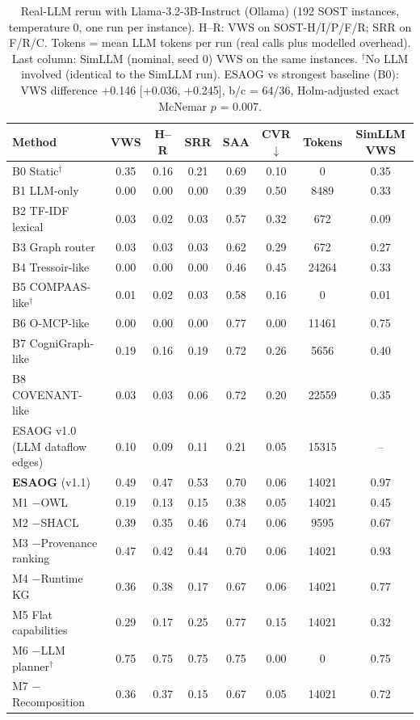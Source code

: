 \begin{table}[H]
\centering
\caption{Real-LLM rerun with Llama-3.2-3B-Instruct (Ollama) (192 SOST instances, temperature 0, one run per instance). H--R: VWS on SOST-H/I/P/F/R; SRR on F/R/C. Tokens = mean LLM tokens per run (real calls plus modelled overhead). Last column: SimLLM (nominal, seed 0) VWS on the same instances. $^\dagger$No LLM involved (identical to the SimLLM run). ESAOG vs strongest baseline (B0): VWS difference +0.146 [+0.036, +0.245], b/c = 64/36, Holm-adjusted exact McNemar $p$ = 0.007.}
\label{tab:real_llama32-3b}
\scriptsize
\begin{tabular}{lccccccc}
\toprule
Method & VWS & H--R & SRR & SAA & CVR$\downarrow$ & Tokens & SimLLM VWS\\
\midrule
B0 Static$^\dagger$ & 0.35 & 0.16 & 0.21 & 0.69 & 0.10 & 0 & 0.35\\
B1 LLM-only & 0.00 & 0.00 & 0.00 & 0.39 & 0.50 & 8489 & 0.33\\
B2 TF-IDF lexical & 0.03 & 0.02 & 0.03 & 0.57 & 0.32 & 672 & 0.09\\
B3 Graph router & 0.03 & 0.03 & 0.03 & 0.62 & 0.29 & 672 & 0.27\\
B4 Tressoir-like & 0.00 & 0.00 & 0.00 & 0.46 & 0.45 & 24264 & 0.33\\
B5 COMPAAS-like$^\dagger$ & 0.01 & 0.02 & 0.03 & 0.58 & 0.16 & 0 & 0.01\\
B6 O-MCP-like & 0.00 & 0.00 & 0.00 & 0.77 & 0.00 & 11461 & 0.75\\
B7 CogniGraph-like & 0.19 & 0.16 & 0.19 & 0.72 & 0.26 & 5656 & 0.40\\
B8 COVENANT-like & 0.03 & 0.03 & 0.06 & 0.72 & 0.20 & 22559 & 0.35\\
ESAOG v1.0 (LLM dataflow edges) & 0.10 & 0.09 & 0.11 & 0.21 & 0.05 & 15315 & --\\
\textbf{ESAOG} (v1.1) & 0.49 & 0.47 & 0.53 & 0.70 & 0.06 & 14021 & 0.97\\
M1 $-$OWL & 0.19 & 0.13 & 0.15 & 0.38 & 0.05 & 14021 & 0.45\\
M2 $-$SHACL & 0.39 & 0.35 & 0.46 & 0.74 & 0.06 & 9595 & 0.67\\
M3 $-$Provenance ranking & 0.47 & 0.42 & 0.44 & 0.70 & 0.06 & 14021 & 0.93\\
M4 $-$Runtime KG & 0.36 & 0.38 & 0.17 & 0.67 & 0.06 & 14021 & 0.77\\
M5 Flat capabilities & 0.29 & 0.17 & 0.25 & 0.77 & 0.15 & 14021 & 0.32\\
M6 $-$LLM planner$^\dagger$ & 0.75 & 0.75 & 0.75 & 0.75 & 0.00 & 0 & 0.75\\
M7 $-$Recomposition & 0.36 & 0.37 & 0.15 & 0.67 & 0.05 & 14021 & 0.72\\
\bottomrule
\end{tabular}
\end{table}
